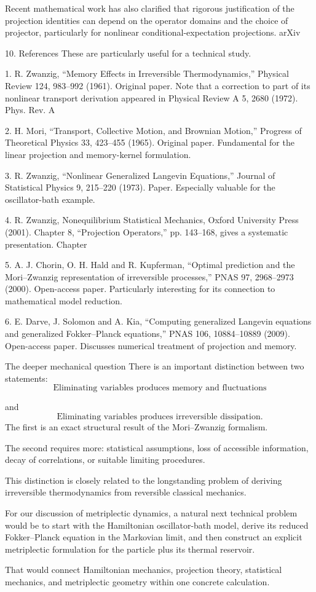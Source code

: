 Recent mathematical work has also clarified that rigorous justification of the projection identities can depend on the operator domains and the choice of projector, particularly for nonlinear conditional-expectation projections. 
arXiv

10. References
These are particularly useful for a technical study.

1. R. Zwanzig, “Memory Effects in Irreversible Thermodynamics,” Physical Review 124, 983–992 (1961). Original paper. Note that a correction to part of its nonlinear transport derivation appeared in Physical Review A 5, 2680 (1972). 
Phys. Rev. A


2. H. Mori, “Transport, Collective Motion, and Brownian Motion,” Progress of Theoretical Physics 33, 423–455 (1965). Original paper. Fundamental for the linear projection and memory-kernel formulation.

3. R. Zwanzig, “Nonlinear Generalized Langevin Equations,” Journal of Statistical Physics 9, 215–220 (1973). Paper. Especially valuable for the oscillator-bath example.

4. R. Zwanzig, Nonequilibrium Statistical Mechanics, Oxford University Press (2001). Chapter 8, “Projection Operators,” pp. 143–168, gives a systematic presentation. Chapter

5. A. J. Chorin, O. H. Hald and R. Kupferman, “Optimal prediction and the Mori–Zwanzig representation of irreversible processes,” PNAS 97, 2968–2973 (2000). Open-access paper. Particularly interesting for its connection to mathematical model reduction.

6. E. Darve, J. Solomon and A. Kia, “Computing generalized Langevin equations and generalized Fokker–Planck equations,” PNAS 106, 10884–10889 (2009). Open-access paper. Discusses numerical treatment of projection and memory.

The deeper mechanical question
There is an important distinction between two statements:
\[
\text{Eliminating variables produces memory and fluctuations}
\]

and
\[
\text{Eliminating variables produces irreversible dissipation}.
\]
The first is an exact structural result of the Mori–Zwanzig formalism.

The second requires more: statistical assumptions, loss of accessible information, decay of correlations, or suitable limiting procedures.

This distinction is closely related to the longstanding problem of deriving irreversible thermodynamics from reversible classical mechanics.

For our discussion of metriplectic dynamics, a natural next technical problem would be to start with the Hamiltonian oscillator-bath model, derive its reduced Fokker–Planck equation in the Markovian limit, and then construct an explicit metriplectic formulation for the particle plus its thermal reservoir.

That would connect Hamiltonian mechanics, projection theory, statistical mechanics, and metriplectic geometry within one concrete calculation.
